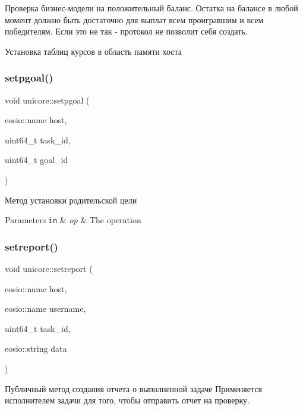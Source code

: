 Проверка бизнес-\/модели на положительный баланс. Остатка на балансе в любой момент должно быть достаточно для выплат всем проигравшим и всем победителям. Если это не так -\/ протокол не позволит себя создать.

Установка таблиц курсов в область памяти хоста\mbox{\label{classunicore_aff7586ddb285e938d5228562eb459234}} 
\subsubsection{\texorpdfstring{setpgoal()}{setpgoal()}}
{\footnotesize\ttfamily void unicore\+::setpgoal (\begin{DoxyParamCaption}\item[{eosio\+::name}]{host,  }\item[{uint64\+\_\+t}]{task\+\_\+id,  }\item[{uint64\+\_\+t}]{goal\+\_\+id }\end{DoxyParamCaption})}



Метод установки родительской цели 


\begin{DoxyParams}[1]{Parameters}
\mbox{\tt in}  & {\em op} & The operation \\
\hline
\end{DoxyParams}
\mbox{\label{classunicore_a178fc39ee1d642454bddeaa3f6084d00}} 
\subsubsection{\texorpdfstring{setreport()}{setreport()}}
{\footnotesize\ttfamily void unicore\+::setreport (\begin{DoxyParamCaption}\item[{eosio\+::name}]{host,  }\item[{eosio\+::name}]{username,  }\item[{uint64\+\_\+t}]{task\+\_\+id,  }\item[{eosio\+::string}]{data }\end{DoxyParamCaption})}



Публичный метод создания отчета о выполненной задаче Применяется исполнителем задачи для того, чтобы отправить отчет на проверку. 


